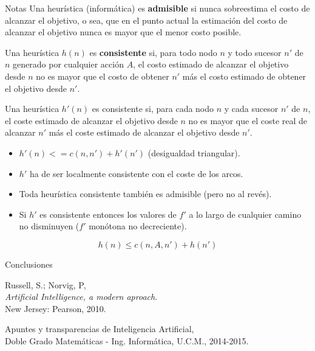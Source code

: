 \documentclass[11pt, a4paper, spanish, openright, twoside]{book}
\begin{document}
\begin{section}{Notas}
	Una heurística (informática) es \textbf{admisible} si nunca sobreestima el costo de alcanzar el objetivo, o sea, 
que en el punto actual la estimación del costo de alcanzar el objetivo nunca es mayor que el menor costo posible.

	Una heurística $h(n)$ es \textbf{consistente} si, para todo nodo $n$ y todo sucesor $n'$ de $n$ generado por cualquier acción $A$, el costo estimado de alcanzar el objetivo desde $n$ no es mayor que el costo de obtener $n'$ más el costo estimado de obtener el objetivo desde $n'$.

	Una heurística $h'(n)$ es consistente si, para cada nodo $n$ y cada sucesor $n'$ de $n$, el coste 
	estimado de alcanzar el objetivo desde $n$ no es mayor que el coste real de 
	alcanzar $n'$ más el coste estimado de alcanzar el objetivo desde $n'$.
		\begin{itemize}
		\item  $h'(n) <= c(n, n') + h'(n')$ (desigualdad triangular).
		\item  $h'$  ha de ser localmente consistente con el coste de los arcos.
		\item Toda heurística consistente también es admisible (pero no al revés).
		\item Si $h'$ es consistente entonces los valores de $f'$ a lo largo de cualquier 
		camino no disminuyen ($f'$ monótona no decreciente).
		\end{itemize}

$$\boxed{h(n) \le c(n, A, n') + h(n')}$$
\end{section}

\begin{section}{Conclusiones}
	
	
	
\end{section}

\begin{thebibliography}{9}

	Russell, S.; Norvig, P, \\
	\emph{Artificial Intelligence, a modern aproach}.\\
	New Jersey: Pearson, 2010.
	
	Apuntes y transparencias de Inteligencia Artificial, \\
	Doble Grado Matemáticas - Ing. Informática, U.C.M., 2014-2015.

\end{thebibliography}
\end{document}
